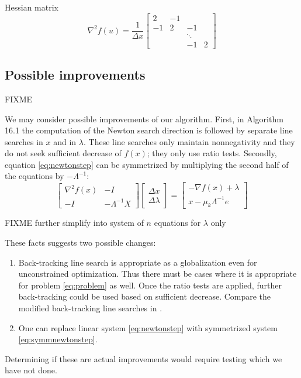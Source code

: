 \documentclass[11pt]{article}
\newcommand{\grad}{\nabla}
\begin{document}
Hessian matrix
\begin{equation}
\grad^2 f(u) = \frac{1}{\Delta x} \begin{bmatrix}
2  & -1 &    &    \\
-1 &  2 & -1 &    \\
   &    & \ddots &\\
   &    & -1 &  2
\end{bmatrix}
\end{equation}

\subsection*{Possible improvements}

FIXME

We may consider possible improvements of our algorithm.  First, in Algorithm 16.1 the computation of the Newton search direction is followed by separate line searches in $x$ and in $\lambda$.  These line searches only maintain nonnegativity and they do not seek sufficient decrease of $f(x)$; they only use ratio tests.  Secondly, equation \eqref{eq:newtonstep} can be symmetrized by multiplying the second half of the equations by $-\Lambda^{-1}$:
\begin{equation}
\begin{bmatrix}
\grad^2 f(x) & - I \\
-I & - \Lambda^{-1} X
\end{bmatrix}
\begin{bmatrix}
\Delta x \\
\Delta \lambda
\end{bmatrix}
=
\begin{bmatrix}
-\grad f(x) + \lambda \\
x - \mu_k \Lambda^{-1} e
\end{bmatrix}
 \label{eq:symmnewtonstep}
\end{equation}

FIXME further simplify into system of $n$ equations for $\lambda$ only

These facts suggests two possible changes:
\begin{enumerate}
\item Back-tracking line search is appropriate as a globalization even for unconstrained optimization.  Thus there must be cases where it is appropriate for problem \eqref{eq:problem} as well.  Once the ratio tests are applied, further back-tracking could be used based on sufficient decrease.  Compare the modified back-tracking line searches in \cite{BensonMunson2006}.
\item One can replace linear system \eqref{eq:newtonstep} with symmetrized system \eqref{eq:symmnewtonstep}.
\end{enumerate}
Determining if these are actual improvements would require testing which we have not done.



\medskip



\end{document}
